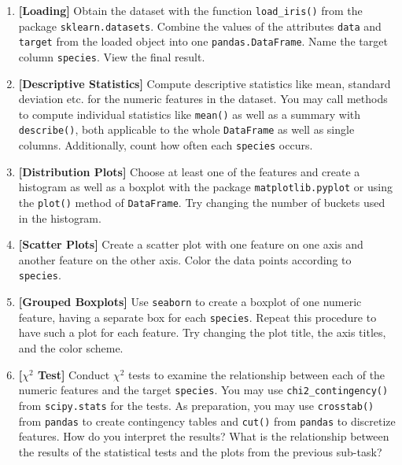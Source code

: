 \documentclass[12pt]{article}
\newcommand{\code}[1]{\textcolor{kitgreen}{\texttt{#1}}}
\newcommand{\taskname}[1]{\textcolor{kitblue}{\textbf{[#1]}}}
\begin{document}
\begin{enumerate}[label=\alph*), left=0pt, itemsep=12pt]
	\item
	\taskname{Loading}
	Obtain the dataset with the function \code{load\_iris()} from the package \code{sklearn.datasets}.
	Combine the values of the attributes \code{data} and \code{target} from the loaded object into one \code{pandas.DataFrame}.
	Name the target column \code{species}.
	View the final result.
	\item
	\taskname{Descriptive Statistics}
	Compute descriptive statistics like mean, standard deviation etc. for the numeric features in the dataset.
	You may call methods to compute individual statistics like \code{mean()} as well as a summary with \code{describe()}, both applicable to the whole \code{DataFrame} as well as single columns.
	Additionally, count how often each \code{species} occurs.
	\item
	\taskname{Distribution Plots}
	Choose at least one of the features and create a histogram as well as a boxplot with the package \code{matplotlib.pyplot} or using the \code{plot()} method of \code{DataFrame}.
	Try changing the number of buckets used in the histogram.
	\item
	\taskname{Scatter Plots}
	Create a scatter plot with one feature on one axis and another feature on the other axis.
	Color the data points according to \code{species}.
	\item
	\taskname{Grouped Boxplots}
	Use \code{seaborn} to create a boxplot of one numeric feature, having a separate box for each \code{species}.
	Repeat this procedure to have such a plot for each feature.
	Try changing the plot title, the axis titles, and the color scheme.
	\item
	\taskname{$\chi^2$ Test}
	Conduct $\chi^2$ tests to examine the relationship between each of the numeric features and the target \code{species}.
	You may use \code{chi2\_contingency()} from \code{scipy.stats} for the tests.
	As preparation, you may use \code{crosstab()} from \code{pandas} to create contingency tables and \code{cut()} from \code{pandas} to discretize features.
	\newline
	How do you interpret the results?
	What is the relationship between the results of the statistical tests and the plots from the previous sub-task?
\end{enumerate}
\end{document}
